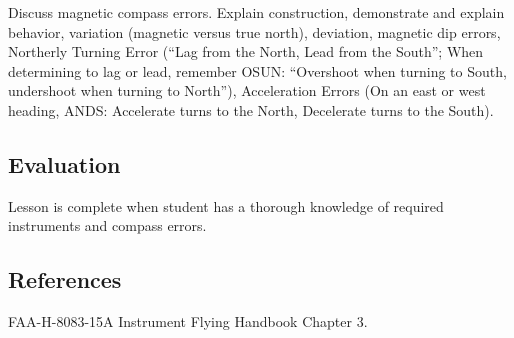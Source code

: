 Discuss magnetic compass errors. Explain construction, demonstrate and explain
behavior, variation (magnetic versus true north), deviation, magnetic dip
errors, Northerly Turning Error (``Lag from the North, Lead from the South'';
When determining to lag or lead, remember OSUN: ``Overshoot when turning to
South, undershoot when turning to North''), Acceleration Errors (On an east or
west heading, ANDS: Accelerate turns to the North, Decelerate turns to the
South).

\subsection{Evaluation}

Lesson is complete when student has a thorough knowledge of required
instruments and compass errors.

\subsection{References}

FAA-H-8083-15A Instrument Flying Handbook Chapter 3.

